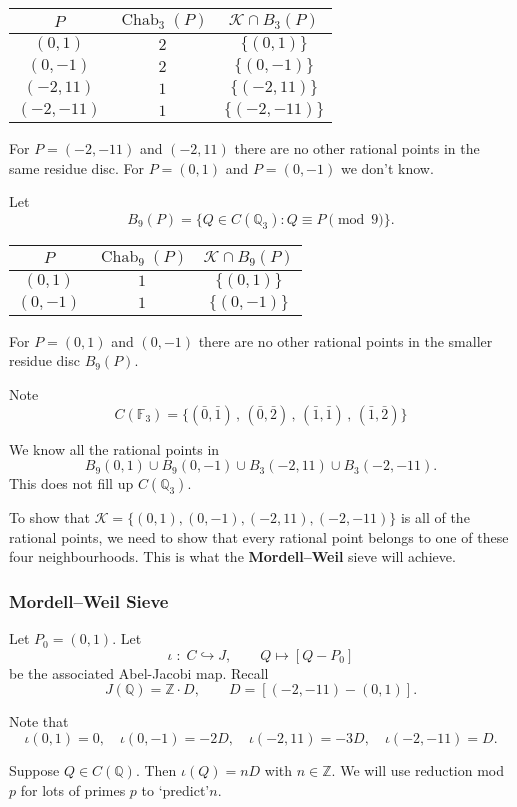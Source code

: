 \documentclass{beamer}
\DeclareMathOperator{\Chab}{Chab}
\newcommand{\Q}{{\mathbb Q}}
\newcommand{\Z}{{\mathbb Z}}
\newcommand{\F}{{\mathbb F}}
\newcommand{\cK}{\mathcal{K}}
\theoremstyle{definition}
\theoremstyle{remark}
\begin{document}
\begin{frame}
\begin{tabular}{|c|c|c|}
\hline
$P$ & $\Chab_3(P)$ & $\cK \cap B_3(P)$ \\
\hline
$(0,1)$ & $2$ & $\{(0,1)\}$ \\
$(0,-1)$ & $2$ & $\{(0,-1)\}$ \\
$(-2,11)$ & $1$ & $\{(-2,11)\}$\\
$(-2,-11)$ & $1$ & $ \{(-2,-11)\}$\\
\hline
\end{tabular}

\medskip

For $P=(-2,-11)$ and $(-2,11)$ there are no other rational 
points in the same residue disc. For $P=(0,1)$ and $P=(0,-1)$
we don't know.

\bigskip
Let
\[
B_9(P)=\{ Q \in C(\Q_3) : Q \equiv P \pmod{9} \}.
\]

\begin{tabular}{|c|c|c|}
\hline
$P$ & $\Chab_9(P)$ & $\cK \cap B_9(P)$ \\
\hline
$(0,1)$ & $1$ & $\{(0,1)\}$ \\
$(0,-1)$ & $1$ & $\{(0,-1)\}$ \\
\hline
\end{tabular}

\medskip

For $P=(0,1)$ and $(0,-1)$ there are no other rational 
points in the smaller residue disc $B_9(P)$. 
\end{frame}

\begin{frame}

Note
\[
C(\F_3)=\{ 
(\bar{0},\bar{1}) \, , \,
(\bar{0},\bar{2}) \, , \,
(\bar{1},\bar{1}) \, , \,
(\bar{1},\bar{2}) 
\}
\]

We know all the rational points in
\[
B_9(0,1) \cup B_9(0,-1) \cup B_3(-2,11) \cup B_3(-2,-11).
\]
This does not fill up $C(\Q_3)$.

To show that $\cK=\{(0,1),(0,-1),(-2,11),(-2,-11)\}$ is
all of the rational points, we need to show that every rational
point belongs to one of these four neighbourhoods. 
This is what  the {\bf Mordell--Weil} sieve will achieve.



\end{frame}

\begin{frame}
\frametitle{Mordell--Weil Sieve}
Let $P_0=(0,1)$. 
Let 
\[
\iota \; : \; C \hookrightarrow J, \qquad Q \mapsto [Q-P_0]
\]
be the associated Abel-Jacobi map.
Recall
\[
J(\Q)=\Z \cdot D, \qquad D=[(-2,-11)-(0,1)].
\]

Note that
\[
\iota(0,1)=0,\quad
\iota(0,-1)=-2D, \quad
\iota(-2,11)=-3D, \quad
\iota(-2,-11)=D.
\]

Suppose $Q \in C(\Q)$. Then $\iota(Q)=nD$ with $n \in \Z$.
We will use reduction mod $p$ for lots of primes $p$
to \lq predict\rq $n$.
\end{frame}
\end{document}
